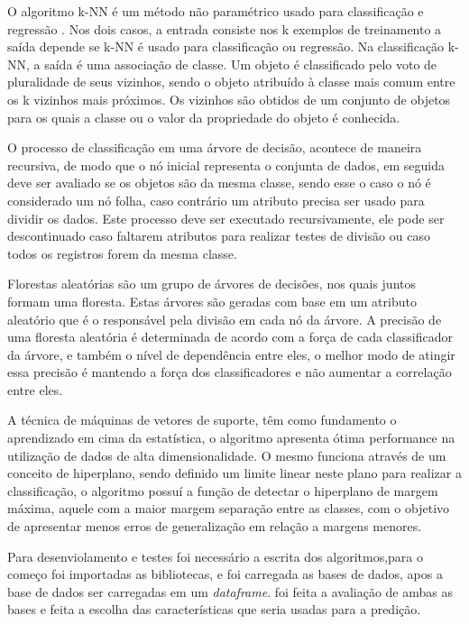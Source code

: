 O algoritmo k-NN é um método não paramétrico usado para classificação e regressão . Nos dois casos, a entrada consiste nos k exemplos de treinamento a saída depende se k-NN é usado para classificação ou regressão. Na classificação k-NN, a saída é uma associação de classe. Um objeto é classificado pelo voto de pluralidade de seus vizinhos, sendo o objeto atribuído à classe mais comum entre os k vizinhos mais próximos. Os vizinhos são obtidos de um conjunto de objetos para os quais a classe ou o valor da propriedade do objeto é conhecida\cite{KamgarParsi1985}.

O processo de classificação em uma árvore de decisão, acontece de maneira recursiva, de modo que o nó inicial representa o conjunta de dados, em seguida deve ser avaliado se os objetos são da mesma classe, sendo esse o caso o nó é considerado um nó folha, caso contrário um atributo precisa ser usado para dividir os dados. Este processo deve ser executado recursivamente, ele pode ser descontinuado caso faltarem atributos para realizar testes de divisão ou caso todos os registros forem da mesma classe\cite{castro}.

Florestas aleatórias são um grupo de árvores de decisões, nos quais juntos formam uma floresta. Estas árvores são geradas com base em um atributo aleatório que é o responsável pela divisão em cada nó da árvore. A precisão de uma floresta aleatória é determinada de acordo com a força de cada classificador da árvore, e também o nível de dependência entre eles, o melhor modo de atingir essa precisão é mantendo a força dos classificadores e não aumentar a correlação entre eles\cite{castro}.

A técnica de máquinas de vetores de suporte, têm como fundamento o aprendizado em cima da estatística, o algoritmo apresenta ótima performance na utilização de dados de alta dimensionalidade. O mesmo funciona através de um conceito de hiperplano, sendo definido um limite linear neste plano para realizar a classificação, o algoritmo possuí a função de detectar o hiperplano de margem máxima, aquele com a maior margem separação entre as classes, com o objetivo de apresentar menos erros de generalização em relação a margens menores\cite{Tan2009}.

Para desenviolamento e testes foi necessário a escrita dos algoritmos,para o começo foi importadas as bibliotecas, e foi carregada as bases de dados, apos a base de dados ser carregadas em um \textit{dataframe}. foi feita a avaliação de ambas as bases e feita a escolha das características que seria usadas para a predição.

